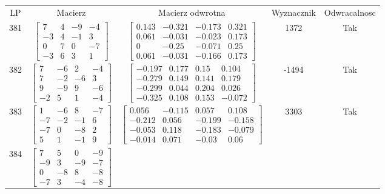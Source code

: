 \documentclass[a4paper,12pt]{article}
\begin{document}
\bgroup {} \vspace{0.2in} \begin{tabular}{c c c c c}
LP & Macierz & Macierz odwrotna & Wyznacznik & Odwracalnosc\\
381
&
$\begin{bmatrix} 7 & 4 & -9 & -4 \\ -3 & 4 & -1 & 3 \\ 0 & 7 & 0 & -7 \\ -3 & 6 & 3 & 1 \end{bmatrix}$
&
$\begin{bmatrix} 0.143 & -0.321 & -0.173 & 0.321 \\ 0.061 & -0.031 & -0.023 & 0.173 \\ 0 & -0.25 & -0.071 & 0.25 \\ 0.061 & -0.031 & -0.166 & 0.173 \end{bmatrix}$
&
1372
&
Tak
\\
382
&
$\begin{bmatrix} 7 & -6 & 2 & -4 \\ 7 & -2 & -6 & 3 \\ 9 & -9 & 9 & -6 \\ -2 & 5 & 1 & -4 \end{bmatrix}$
&
$\begin{bmatrix} -0.197 & 0.177 & 0.15 & 0.104 \\ -0.279 & 0.149 & 0.141 & 0.179 \\ -0.299 & 0.044 & 0.204 & 0.026 \\ -0.325 & 0.108 & 0.153 & -0.072 \end{bmatrix}$
&
-1494
&
Tak
\\
383
&
$\begin{bmatrix} 1 & -6 & 8 & -7 \\ -7 & -2 & -1 & 6 \\ -7 & 0 & -8 & 2 \\ 5 & 1 & -1 & 9 \end{bmatrix}$
&
$\begin{bmatrix} 0.056 & -0.115 & 0.057 & 0.108 \\ -0.212 & 0.056 & -0.199 & -0.158 \\ -0.053 & 0.118 & -0.183 & -0.079 \\ -0.014 & 0.071 & -0.03 & 0.06 \end{bmatrix}$
&
3303
&
Tak
\\
384
&
$\begin{bmatrix} 7 & 5 & 0 & -9 \\ -9 & 3 & -9 & -7 \\ 0 & -8 & 8 & -8 \\ -7 & 3 & -4 & -8 \end{bmatrix}$

\end{tabular}
\end{document}
